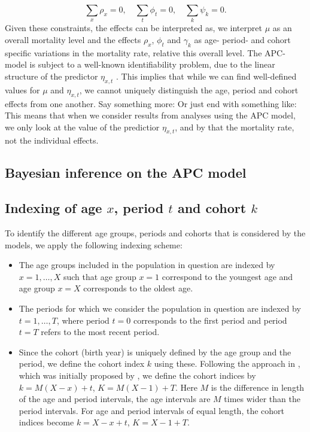 \begin{equation}
    \sum_{x}\rho_x = 0, \quad \sum_{t}\phi_t = 0, \quad \sum_{k} \psi_k = 0. 
    \label{eq:APCconstraints}
\end{equation}
Given these constraints, the effects can be interpreted as, we interpret $\mu$ as an overall mortality level \cite{RieblerThesis2010} and the effects $\rho_x$, $\phi_t$ and $\gamma_k$ as age- period- and cohort specific variations in the mortality rate, relative this overall level. 
\newpar The APC-model is subject to a well-known identifiability problem, due to the linear structure of the predictor $\eta_{x,t}$ \cite{RieblerThesis2010}. This implies that while we can find well-defined values for $\mu$ and $\eta_{x,t}$, we cannot uniquely distinguish the age, period and cohort effects from one another. 
\textcolor{myDarkGreen}{Say something more: Or just end with something like: This means that when we consider results from analyses using the APC model, we only look at the value of the predictior $\eta_{x,t}$, and by that the mortality rate, not the individual effects. 
}

\subsection{Bayesian inference on the APC model}


\subsection{Indexing of age $x$, period $t$ and cohort $k$}
To identify the different age groups, periods and cohorts that is considered by the models, we apply the following indexing scheme:
\begin{itemize}
    \item The age groups included in the population in question are indexed by $x = 1,\ldots,X$ such that age group $x=1$ correspond to the youngest age and age group $x=X$ corresponds to the oldest age.
    \item The periods for which we consider the population in question are indexed by $t=1,\ldots,T$, where period $t=0$ corresponds to the first period and period $t = T$ refers to the most recent period. 
    \item Since the cohort (birth year) is uniquely defined by the age group and the period, we define the cohort index $k$ using these. Following the approach in \cite{rieblerHeld2010}, which was initially proposed by \cite{Heuer1997}, we define the cohort indices by $k = M(X - x) + t$, $K = M(X - 1) + T$. Here $M$ is the difference in length of the age and period intervals, the age intervals are $M$ times wider than the period intervals. For age and period intervals of equal length, the cohort indices become $k = X - x + t$, $K = X - 1 + T.$
\end{itemize}

